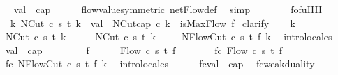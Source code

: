 \begin{isabellebody}
\ \isamarkupfalse%
\ {\isachardoublequoteopen}val\ {\isacharequal}\ cap{\isachardoublequoteclose}\isanewline
\ \ \ \ \isamarkupfalse%
\ flow{\isacharunderscore}value{\isacharbrackleft}symmetric{\isacharbrackright}\ netFlow{\isacharunderscore}def\ \isamarkupfalse%
\ simp\isanewline
{}\isamarkupfalse%
%
\endisatagproof
{\isafoldproof}%
%
\isadelimproof
\isanewline
%
\endisadelimproof
\ \ \ \ \ \ \isanewline
{}\isamarkupfalse%
\ fofu{\isacharunderscore}III{\isacharunderscore}I{\isacharcolon}\ \isanewline
\ \ {\isachardoublequoteopen}{\isasymexists}k{\isachardot}\ NCut\ c\ s\ t\ k\ {\isasymand}\ val\ {\isacharequal}\ NCut{\isachardot}cap\ c\ k\ {\isasymLongrightarrow}\ isMaxFlow\ f{\isachardoublequoteclose}\isanewline
%
\isadelimproof
%
\endisadelimproof
%
\isatagproof
{}\isamarkupfalse%
\ clarify\isanewline
\ \ \isamarkupfalse%
\ k\isanewline
\ \ \isamarkupfalse%
\ {\isachardoublequoteopen}NCut\ c\ s\ t\ k{\isachardoublequoteclose}\isanewline
\ \ \isamarkupfalse%
\ \isamarkupfalse%
\ NCut\ c\ s\ t\ k\ \isacommand{{\isachardot}}\isamarkupfalse%
\isanewline
\ \ \isamarkupfalse%
\ NFlowCut\ c\ s\ t\ f\ k\ \isamarkupfalse%
\ intro{\isacharunderscore}locales\isanewline
\isanewline
\ \ \isamarkupfalse%
\ {\isachardoublequoteopen}val\ {\isacharequal}\ cap{\isachardoublequoteclose}\isanewline
\ \ \isacommand{{\isacharbraceleft}}\isamarkupfalse%
\isanewline
\ \ \ \ \isamarkupfalse%
\ f{\isacharprime}\isanewline
\ \ \ \ \isamarkupfalse%
\ {\isachardoublequoteopen}Flow\ c\ s\ t\ f{\isacharprime}{\isachardoublequoteclose}\isanewline
\ \ \ \ \isamarkupfalse%
\ \isamarkupfalse%
\ fc{\isacharprime}{\isacharcolon}\ Flow\ c\ s\ t\ f{\isacharprime}\ \isacommand{{\isachardot}}\isamarkupfalse%
\isanewline
\ \ \ \ \isamarkupfalse%
\ fc{\isacharprime}{\isacharcolon}\ NFlowCut\ c\ s\ t\ f{\isacharprime}\ k\ \isamarkupfalse%
\ intro{\isacharunderscore}locales\isanewline
\isanewline
\ \ \ \ \isamarkupfalse%
\ {\isachardoublequoteopen}fc{\isacharprime}{\isachardot}val\ {\isasymle}\ cap{\isachardoublequoteclose}\ \isamarkupfalse%
\ fc{\isacharprime}{\isachardot}weak{\isacharunderscore}duality\ \isacommand{{\isachardot}}\isamarkupfalse%
\isanewline
\ \ \ \ \isamarkupfalse%
\ \isamarkupfalse%

\end{isabellebody}
